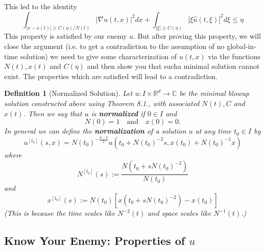 \documentclass{article}
\newtheorem{definition}{Definition}
\def\R{\mathbb{R}} %
\begin{document}
This led to the identity
\begin{equation*}
  \int_{|x-x(t)| \geq C(\eta)/N(t)} \left| \nabla u(t,x) \right|^{2}dx
  + \int_{\left| \xi \right| \geq C(\eta)} \left| \xi \hat{u}(t,\xi) \right|^{2}d\xi 
  \leq \eta
\end{equation*}
This property is satisfied by our enemy $u$. But after proving this property, we
will close the argument (i.e. to get a contradiction to the assumption of no
global-in-time solution) we need to give some characterization of $u(t,x)$ via
the functions $N(t),x(t)$ and $C(\eta)$ and then show you that sucha minimal
solution cannot exist. The properties which are satisfied will lead to a
contradiction.
\begin{definition}[Normalized Solution]
  \label{def:normalized-solution}
  Let $u:I\times \R^d  \to \mathbb{C}$ be the minimal blowup solution
  constructed above using Theorem 8.1., with associated $N(t), C$ and $x(t)$.
  Then we say that $u$ is \textbf{normalized} if $0\in I$ and
  \begin{equation*}
    N(0) = 1
    \quad \text{and} \quad
    x(0)=0.
  \end{equation*}
  In general we can define the \textbf{normalization} of a solution $u$ at any
  time $t_{0}\in I$ by
  \begin{equation*}
    u^{[t_{0}]}(s,x) = N(t_{0})^{-\frac{d-2}{2}}u\left(t_{0}+N(t_{0})^{-2}s,x(t_{0})+N(t_{0})^{-1}x\right)
  \end{equation*}
  where
  \begin{equation*}
    N^{[t_{0}]}(s):= \frac{N(t_{0}+sN(t_{0})^{-2})}{N(t_{0})}
  \end{equation*}
  and
  \begin{equation*}
    x^{[t_{0}]}(s) := N(t_{0})\left[ x(t_{0}+sN(t_{0})^{-2})-x(t_{0}) \right] 
  \end{equation*}
  (This is because the time scales like $N^{-2}(t)$ and space scales like $N^{-1}(t)$.) 
\end{definition}

\subsection{Know Your Enemy: Properties of $u$}
\end{document}
